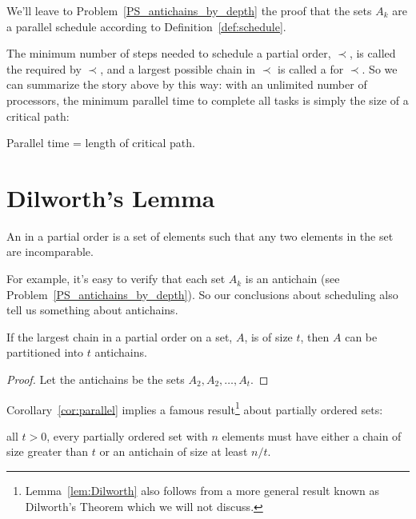 We'll leave to Problem~\ref{PS_antichains_by_depth} the proof that the
sets $A_k$ are a parallel schedule according to
Definition~\ref{def:schedule}.

The minimum number of steps needed to schedule a partial order,
$\prec$, is called the  required by $\prec$, and a
largest possible chain in $\prec$ is called a  for
$\prec$.  So we can summarize the story above by this way: with an
unlimited number of processors, the minimum parallel time to complete
all tasks is simply the size of a critical path:

\begin{corollary}\label{cor:critical-path-time}
Parallel time = length of critical path.
\end{corollary}

\section{Dilworth's Lemma}

\begin{definition}
An  in a partial order is a set of elements such that any
two elements in the set are incomparable.
\end{definition}

For example, it's easy to verify that each set $A_k$ is an antichain
(see Problem~\ref{PS_antichains_by_depth}).  So our conclusions about
scheduling also tell us something about antichains.

\begin{corollary}\label{cor:parallel}
If the largest chain in a partial order on a set, $A$, is of size $t$,
then $A$ can be partitioned into $t$ antichains.
\end{corollary}

\begin{proof}
Let the antichains be the sets $A_2, A_2,\dots,A_t$.
\end{proof}

Corollary~\ref{cor:parallel} implies a famous
result\footnote{Lemma~\ref{lem:Dilworth} also follows from a more
  general result known as Dilworth's Theorem which we will not
  discuss.} about partially ordered sets:

\begin{lemma}[Dilworth]\label{lem:Dilworth}
 all $t>0$, every partially ordered set with
$n$ elements must have either a chain of size greater than $t$ or an
antichain of size at least $n / t$.
\end{lemma}

